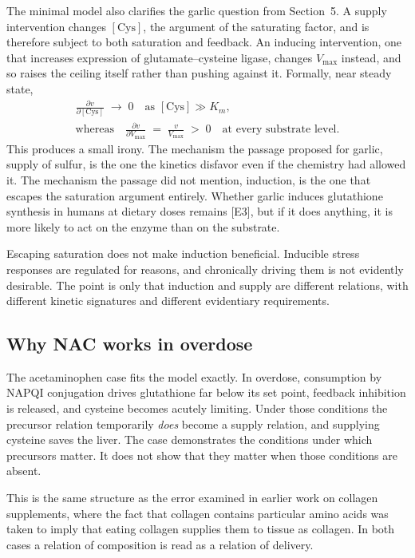 \documentclass[11pt,a4paper]{article}
\theoremstyle{plain}
\theoremstyle{definition}
\theoremstyle{remark}
\newcommand{\tier}[1]{\textup{\textsc{[#1]}}}
\newcommand{\Ethree}{\tier{E3}}
\begin{document}
The minimal model also clarifies the garlic question from Section~5. A supply intervention changes $[\mathrm{Cys}]$, the argument of the saturating factor, and is therefore subject to both saturation and feedback. An inducing intervention, one that increases expression of glutamate--cysteine ligase, changes $V_{\max}$ instead, and so raises the ceiling itself rather than pushing against it. Formally, near steady state,
\begin{gather*}
\frac{\partial v}{\partial [\mathrm{Cys}]} \;\to\; 0 \quad\text{as } [\mathrm{Cys}] \gg K_m,\\[4pt]
\text{whereas}\quad
\frac{\partial v}{\partial V_{\max}} \;=\; \frac{v}{V_{\max}} \;>\; 0 \quad\text{at every substrate level.}
\end{gather*}
This produces a small irony. The mechanism the passage proposed for garlic, supply of sulfur, is the one the kinetics disfavor even if the chemistry had allowed it. The mechanism the passage did not mention, induction, is the one that escapes the saturation argument entirely. Whether garlic induces glutathione synthesis in humans at dietary doses remains \Ethree, but if it does anything, it is more likely to act on the enzyme than on the substrate.

\begin{caution}
Escaping saturation does not make induction beneficial. Inducible stress responses are regulated for reasons, and chronically driving them is not evidently desirable. The point is only that induction and supply are different relations, with different kinetic signatures and different evidentiary requirements.
\end{caution}

\subsection{Why NAC works in overdose}

The acetaminophen case fits the model exactly. In overdose, consumption by NAPQI conjugation drives glutathione far below its set point, feedback inhibition is released, and cysteine becomes acutely limiting. Under those conditions the precursor relation temporarily \emph{does} become a supply relation, and supplying cysteine saves the liver. The case demonstrates the conditions under which precursors matter. It does not show that they matter when those conditions are absent.

This is the same structure as the error examined in earlier work on collagen supplements, where the fact that collagen contains particular amino acids was taken to imply that eating collagen supplies them to tissue as collagen. In both cases a relation of composition is read as a relation of delivery.
\end{document}
